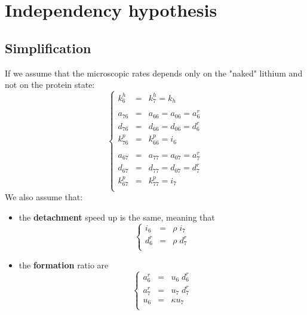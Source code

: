 \documentclass[aps,onecolumn,11pt]{revtex4}
\begin{document}
\section{Independency hypothesis}
\subsection{Simplification}

If we assume that the microscopic rates depends only on the "naked" lithium and not on the protein state:
\begin{equation}
\label{eq:indep}
\left\lbrace
\begin{array}{rcl}
k^h_6    & = & k^h_7 = k_h\\
\\
a_{76}   & = & a_{66} = a_{06} = a^r_6\\
d_{76}   & = & d_{66} = d_{06} = d^r_6\\
k^p_{76} & = & k^p_{66} = i_6\\
\\
a_{67}   & = & a_{77} = a_{07} = a^r_7 \\
d_{67}   & = & d_{77} = d_{07} = d^r_7\\
k^p_{67} & = & k^p_{77} = i_7\\
\end{array}
\right.
\end{equation}
We also assume that:
\begin{itemize}
\item the {\bf detachment} speed up is the same, meaning that
\begin{equation}
\left\lbrace
\begin{array}{rcl}
	i_6 & = & \rho \; i_7\\
	d^r_6 & = & \rho \; d^r_7\\
\end{array}
\right.
\end{equation}
\item the {\bf formation} ratio are
\begin{equation}
\left\lbrace
\begin{array}{rcl}
	a^r_6 & = & u_6 \; d^r_6\\
	a^r_7 & = & u_7 \; d^r_7 \\
	u_6   & = & \kappa u_7 \\
\end{array}
\right.
\end{equation}
\end{itemize}
\end{document}
